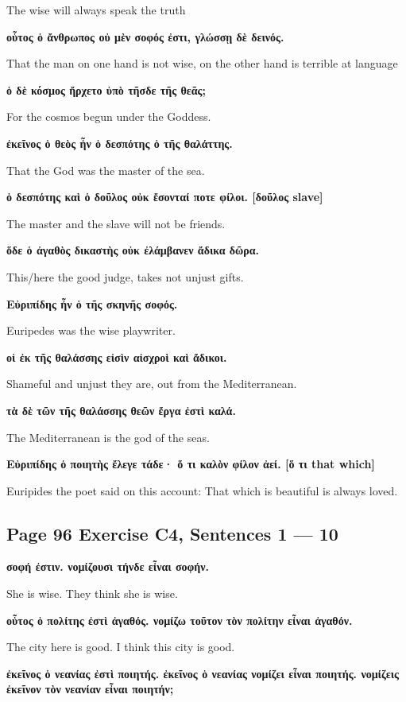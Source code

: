 The wise will always speak the truth

\noindent\textbf{οὗτος ὁ ἄνθρωπος οὐ μὲν σοφός ἐστι, γλώσσῃ δὲ δεινός.}

That the man on one hand is not wise, on the other hand is terrible at language

\noindent\textbf{ὁ δὲ κόσμος ἤρχετο ὑπὸ τῆσδε τῆς θεᾶς;}

For the cosmos begun under the Goddess.

\noindent\textbf{ἐκεῖνος ὁ θεὸς ἦν ὁ δεσπότης ὁ τῆς θαλάττης.}

That the God was the master of the sea.

\noindent\textbf{ὁ δεσπότης καὶ ὁ δοῦλος οὐκ ἔσονταί ποτε φίλοι. [δοῦλος slave]}

The master and the slave will not be friends.

\noindent\textbf{ὅδε ὁ ἀγαθὸς δικαστὴς οὐκ ἐλάμβανεν ἄδικα δῶρα.}

This/here the good judge, takes not unjust gifts.

\noindent\textbf{Εὐριπίδης ἦν ὁ τῆς σκηνῆς σοφός.}

Euripedes was the wise playwriter.

\noindent\textbf{οἱ ἐκ τῆς θαλάσσης εἰσὶν αἰσχροὶ καὶ ἄδικοι.}

Shameful and unjust they are, out from the Mediterranean.

\noindent\textbf{τὰ δὲ τῶν τῆς θαλάσσης θεῶν ἔργα ἐστὶ καλά.}

The Mediterranean is the god of the seas.


\noindent\textbf{Εὐριπίδης ὁ ποιητὴς ἔλεγε τάδε· ὅ τι καλὸν φίλον ἀεί. [ὅ τι that which]}

Euripides the poet said on this account: That which is beautiful is always loved.

\subsection*{Page 96 Exercise C4, Sentences 1 --- 10}
\noindent\textbf{σοφή ἐστιν. νομίζουσι τήνδε εἶναι σοφήν.}

She is wise. They think she is wise.

\noindent\textbf{οὗτος ὁ πολίτης ἐστὶ ἀγαθός. νομίζω τοῦτον τὸν πολίτην εἶναι ἀγαθόν.}

The city here is good. I think this city is good.

\noindent\textbf{ἐκεῖνος ὁ νεανίας ἐστὶ ποιητής. ἐκεῖνος ὁ νεανίας νομίζει εἶναι ποιητής. νομίζεις ἐκεῖνον τὸν νεανίαν εἶναι ποιητήν;}

